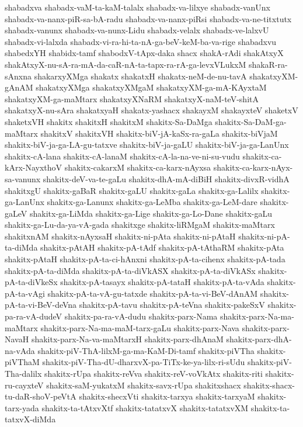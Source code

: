 {shabadxva
shabadx-vaM-ta-kaM-talalx
shabadx-va-lilxye
shabadx-vanUnx
shabadx-va-nanx-piR-sa-bA-radu
shabadx-va-nanx-piRsi
shabadx-va-ne-titxtutx
shabadx-vanunx
shabadx-va-nunx-Lidu
shabadx-velalx
shabadx-ve-lalxvU
shabadx-vi-lalxda
shabadx-vi-ra-hi-ta-nA-ga-beV-keM-ba-va-rige
shabadxvu
shabedxYH
shabidx-tamf
shabodxV-tApx-daka
shacx
shakA-rAdi
shakAtxyX
shakAtxyX-nu-sA-ra-mA-da-caR-nA-ta-tapx-ra-rA-ga-levxVLukxM
shakaR-ra-sAnxna
shakarxyXMga
shakatx
shakatxH
shakatx-neM-de-nu-tavA
shakatxyXM-gAnAM
shakatxyXMga
shakatxyXMgaM
shakatxyXM-ga-mA-KAyxtaM
shakatxyXM-ga-maMtarx
shakatxyXNaRM
shakatxyX-naM-teV-shitA
shakatxyX-nu-sAra
shakatxyaH
shakatx-yashacx
shakayxM
shakayxteV
shaketxV
shaketxVH
shakitx
shakitxH
shakitxM
shakitx-Sa-DaMga
shakitx-Sa-DaM-ga-maMtarx
shakitxV
shakitxVH
shakitx-biV-jA-kaSx-ra-gaLa
shakitx-biVjaM
shakitx-biV-ja-ga-LA-gu-tatxve
shakitx-biV-ja-gaLU
shakitx-biV-ja-ga-LanUnx
shakitx-cA-lana
shakitx-cA-lanaM
shakitx-cA-la-na-ve-ni-su-vudu
shakitx-ca-kArx-NayxthoV
shakitx-cakarxM
shakitx-ca-karx-nAyxsa
shakitx-ca-karx-nAyx-sa-vanunx
shakitx-deV-va-te-gaLu
shakitx-dhA-mA-diBiH
shakitx-divxR-vidhA
shakitxgU
shakitx-gaBaR
shakitx-gaLU
shakitx-gaLa
shakitx-ga-Lalilx
shakitx-ga-LanUnx
shakitx-ga-Lanunx
shakitx-ga-LeMba
shakitx-ga-LeM-dare
shakitx-gaLeV
shakitx-ga-LiMda
shakitx-ga-Lige
shakitx-ga-Lo-Dane
shakitx-gaLu
shakitx-ga-Lu-da-ya-vA-gada
shakitxge
shakitx-liRMgaM
shakitx-maMtarx
shakitxnAM
shakitx-nAyxsaH
shakitx-ni-pAta
shakitx-ni-pAtaH
shakitx-ni-pA-ta-diMda
shakitx-pAtAH
shakitx-pA-tAdf
shakitx-pA-tAthaRM
shakitx-pAta
shakitx-pAtaH
shakitx-pA-ta-ci-hAnxni
shakitx-pA-ta-cihenx
shakitx-pA-tada
shakitx-pA-ta-diMda
shakitx-pA-ta-diVkASX
shakitx-pA-ta-diVkASx
shakitx-pA-ta-diVkeSx
shakitx-pA-tasayx
shakitx-pA-tataH
shakitx-pA-ta-vAda
shakitx-pA-ta-vAgi
shakitx-pA-ta-vA-gu-tatxde
shakitx-pA-ta-vi-BeV-dAnAM
shakitx-pA-ta-vi-BeV-deVna
shakitx-pA-tavu
shakitx-pA-teVna
shakitx-pakeSxV
shakitx-pa-ra-vA-dudeV
shakitx-pa-ra-vA-dudu
shakitx-parx-Nama
shakitx-parx-Na-ma-maMtarx
shakitx-parx-Na-ma-maM-tarx-gaLu
shakitx-parx-Nava
shakitx-parx-NavaH
shakitx-parx-Na-va-maMtarxH
shakitx-parx-dhAnaM
shakitx-parx-dhA-na-vAda
shakitx-piV-ThA-lilxM-ga-ma-KaM-Di-tamf
shakitx-piVTha
shakitx-piVThaM
shakitx-piV-Tha-dU-dharxvX-pa-TiTx-ke-ya-lilx-ri-sUdu
shakitx-piV-Tha-dalilx
shakitx-rUpa
shakitx-reVva
shakitx-reV-voVkAtx
shakitx-riti
shakitx-ru-cayxteV
shakitx-saM-yukatxM
shakitx-savx-rUpa
shakitxshacx
shakitx-shacx-tu-daR-shoV-peVtA
shakitx-shecxVti
shakitx-tarxya
shakitx-tarxyaM
shakitx-tarx-yada
shakitx-ta-tAtxvXtf
shakitx-tatatxvX
shakitx-tatatxvXM
shakitx-ta-tatxvX-diMda
}

